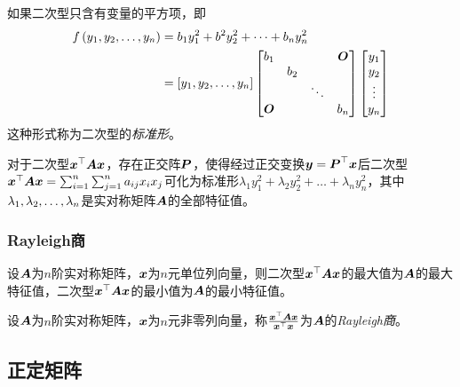 \documentclass{ctexart}
\begin{document}
\begin{definition}[二次型的标准形]
    如果二次型只含有变量的平方项，即
    \begin{align*}
        f\left( {y}_1,{y}_2,\dots,{y}_{n} \right) & =b_1y_1^2+b^2y_2^2+\dots+b_ny_n^2                                         \\
                              & =\left[ {y}_1,{y}_2,\dots,{y}_{n} \right]\begin{bmatrix}
            b_1   &     &        & \boldsymbol{O} \\
                  & b_2 &        &       \\
                  &     & \ddots &       \\
            \boldsymbol{O} &     &        & b_n
        \end{bmatrix}\begin{bmatrix}
            y_1 \\y_2\\\vdots\\y_n
        \end{bmatrix}
    \end{align*}
    这种形式称为二次型的\emph{标准形}。
\end{definition}

\begin{theorem}
    对于二次型\(\boldsymbol{x}^\top\boldsymbol{A}\boldsymbol{x}\)，存在正交阵\(\boldsymbol{P}\)，使得经过正交变换\(\boldsymbol{y}=\boldsymbol{P}^\top\boldsymbol{x}\)后二次型\(\boldsymbol{x}^\top\boldsymbol{A}\boldsymbol{x}=\sum_{i=1}^n\sum_{j=1}^na_{ij}x_ix_j\)可化为标准形\(\lambda_1y_1^2+\lambda_2y_2^2+\dots+\lambda_ny_n^2\)，其中\({\lambda}_1,{\lambda}_2,\dots,{\lambda}_{n}\)是实对称矩阵\(\boldsymbol{A}\)的全部特征值。
\end{theorem}

\subsubsection*{Rayleigh商}

\begin{theorem}
    设\(\boldsymbol{A}\)为\(n\)阶实对称矩阵，\(\boldsymbol{x}\)为\(n\)元单位列向量，则二次型\(\boldsymbol{x}^\top\boldsymbol{A}\boldsymbol{x}\)的最大值为\(\boldsymbol{A}\)的最大特征值，二次型\(\boldsymbol{x}^\top\boldsymbol{A}\boldsymbol{x}\)的最小值为\(\boldsymbol{A}\)的最小特征值。
\end{theorem}

\begin{definition}[Rayleigh商]
    设\(\boldsymbol{A}\)为\(n\)阶实对称矩阵，\(\boldsymbol{x}\)为\(n\)元非零列向量，称\(\frac{\boldsymbol{x}^\top\boldsymbol{A}\boldsymbol{x}}{\boldsymbol{x}^\top\boldsymbol{x}}\)为\(\boldsymbol{A}\)的\emph{Rayleigh商}。
\end{definition}

\subsection{正定矩阵}
\end{document}
